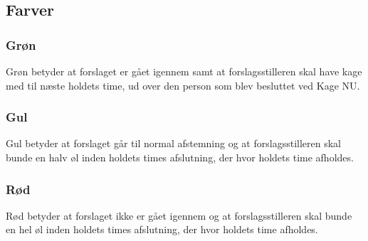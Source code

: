 \documentclass{article}
\begin{document}
	\subsection{Farver}
	\subsubsection{Grøn}
	Grøn betyder at forslaget er gået igennem samt at forslagsstilleren skal have kage med til næste holdets time, ud over den person som blev besluttet ved Kage NU.
	\subsubsection{Gul}
	Gul betyder at forslaget går til normal afstemning og at forslagsstilleren skal bunde en halv øl inden holdets times afslutning, der hvor holdets time afholdes.
	\subsubsection{Rød}
	Rød betyder at forslaget ikke er gået igennem og at forslagsstilleren skal bunde en hel øl inden holdets times afslutning, der hvor holdets time afholdes.


	\vfill
	\doclicenseThis
\end{document}
